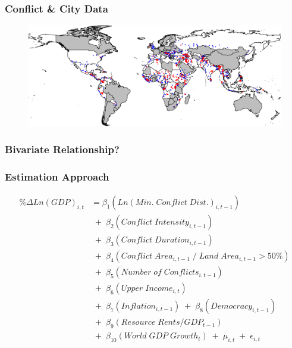 \begin{frame}
\frametitle{Conflict \& City Data}

\begin{figure}[ht]
  \centering
  \includegraphics[width=1\textwidth]{CityConfMap-crop}
\end{figure}

\end{frame}

\begin{frame}
\frametitle{Bivariate Relationship?}

\vspace{-0.25cm}
\begin{figure}[ht]
  \centering
  \resizebox{1\textwidth}{!}{}
\end{figure}

\end{frame}

\begin{frame}
\frametitle{Estimation Approach}

\begin{align*}
	\% \Delta Ln(GDP)_{i,t} &= \beta_{1}(Ln(Min. \; Conflict \; Dist.)_{i,t-1}) \\
	& \;+\; \beta_{2}(Conflict \; Intensity_{i,t-1}) \\
	& \;+\; \beta_{3}(Conflict \; Duration_{i,t-1}) \\
	& \;+\; \beta_{4}(Conflict \; Area_{i,t-1} \;/\; Land \; Area_{i,t-1} > 50\%) \\
	& \;+\; \beta_{5}(Number \; of \; Conflicts_{i,t-1}) \\
	& \;+\; \beta_{6}(Upper \; Income_{i,t}) \\	
	& \;+\; \beta_{7}(Inflation_{i,t-1}) \;+\; \beta_{8}(Democracy_{i,t-1}) \\
	& \;+\; \beta_{9}(Resource \; Rents/GDP_{t-1}) \\ 
	& \;+\; \beta_{10}(World \; GDP \; Growth_{t}) \;+\; \mu_{i,t} \;+\; \epsilon_{i,t}
\end{align*}

\end{frame}

